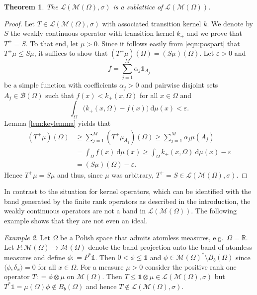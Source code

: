 \documentclass{amsart}
\numberwithin{equation}{section}
\newtheorem{thm}{Theorem}[section]
\theoremstyle{remark}
\newtheorem{example}[thm]{Example}
\theoremstyle{definition}
\begin{document}
\begin{thm}
\label{thm:main}
	The $\mathscr{L}(\mathscr{M}(\Omega),\sigma)$ is a sublattice of $\mathscr{L}(\mathscr{M}(\Omega))$.
\end{thm}
\begin{proof}
	Let $T\in\mathscr{L}(\mathscr{M}(\Omega),\sigma)$ with associated transition kernel $k$.
	We denote by $S$ the weakly continuous operator with transition kernel $k_+$ and we prove that $T^+ = S$.
	To that end, let $\mu>0$.
	Since it follows easily from \eqref{eqn:pospart} that $T^+\mu \leq S\mu$, it suffices to show that $(T^+\mu)(\Omega) = (S\mu)(\Omega)$.
	Let ${\varepsilon}>0$ and 
	\[ f = \sum_{j=1}^M \alpha_j \mathds{1}_{A_j}\]
	be a simple function with coefficients $\alpha_j >0$ and pairwise disjoint sets $A_j \in \mathscr{B}(\Omega)$ such that
	$f(x) < k_+(x,\Omega)$ for all $x\in \Omega$ and
	\[ \int_\Omega \biggl(k_+(x,\Omega) - f(x)\biggr) {\:\mathrm{d}}\mu(x) < {\varepsilon}.\]
	Lemma \ref{lem:keylemma} yields that
	\begin{align*}
		(T^+\mu)(\Omega) &\geq \sum_{j=1}^M (T^+ \mu_{A_j}) (\Omega) \geq \sum_{j=1}^M \alpha_j \mu(A_j)\\
		&= \int_\Omega f(x) {\:\mathrm{d}}\mu(x) \geq \int_\Omega k_+(x,\Omega){\:\mathrm{d}}\mu(x) - {\varepsilon}\\
		&= (S\mu) (\Omega)-{\varepsilon}.
	\end{align*}
	Hence $T^+\mu = S\mu$ and thus, since $\mu$ was arbitrary, $T^+ = S \in \mathscr{L}(\mathscr{M}(\Omega),\sigma)$.
\end{proof}

In contrast to the situation for kernel operators, which can be identified with the band generated by the finite rank operators
as described in the introduction, the weakly continuous operators are not a band in $\mathscr{L}(\mathscr{M}(\Omega))$. 
The following example shows that they are not even an ideal.

\begin{example}
\label{ex:noideal}
	Let $\Omega$ be a Polish space that admits atomless measures, e.g.\ $\Omega = {\mathds{R}}$. Let
	$P:\mathscr{M}(\Omega) \to \mathscr{M}(\Omega)$ denote the band projection onto the band of atomless
	measures and define $\phi {\mathrel{\mathop:}=} P^*\mathds{1}$.
	Then $0<\phi \leq \mathds{1}$ and $\phi \in \mathscr{M}(\Omega)^*\setminus B_b(\Omega)$ since ${\langle {\phi},{\delta_x}\rangle}=0$ for all $x\in \Omega$.
	For a measure $\mu > 0$ consider the positive rank one operator
	$T {\mathrel{\mathop:}=} \phi \otimes \mu$ on $\mathscr{M}(\Omega)$. Then $T \leq \mathds{1}\otimes \mu \in \mathscr{L}(\mathscr{M}(\Omega),\sigma)$
	but $T^*\mathds{1} = \mu(\Omega) \phi \not\in B_b(\Omega)$ and hence $T\not\in\mathscr{L}(\mathscr{M}(\Omega),\sigma)$.
\end{example}
\end{document}
